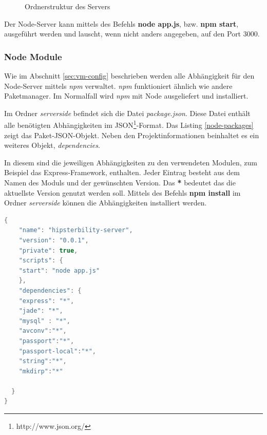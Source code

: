 \begin{figure}[h!]
	\centering
			\begin{minipage}[c]{\textwidth} %
			\end{minipage}
	\caption{Ordnerstruktur des Servers}
	\label{fig:server-tree}
\end{figure}

Der Node-Server kann mittels des Befehls \textbf{node app.js}, bzw. \textbf{npm start}, ausgeführt werden und lauscht, wenn nicht anders angegeben, auf den Port 3000. 

\subsubsection{Node Module \label{sec:node-mudules}}

Wie im Abschnitt \ref{sec:vm-config} beschrieben werden alle Abhängigkeit für den Node-Server mittels \emph{npm} verwaltet. 
\emph{npm} funktioniert ähnlich wie andere Paketmanager. 
Im Normalfall wird \emph{npm} mit Node ausgeliefert und installiert. 

Im Ordner \textit{serverside} befindet sich die Datei \emph{package.json}. Diese Datei enthält alle benötigten Abhängigkeiten im JSON\footnote{http://www.json.org/}-Format. Das Listing \ref{node-packages} zeigt das Paket-JSON-Objekt. 
Neben den Projektinformationen beinhaltet es ein weiteres Objekt, \emph{dependencies}. 

In diesem sind die jeweiligen Abhängigkeiten zu den verwendeten Modulen, zum Beispiel das Express-Framework, enthalten. Jeder Eintrag besteht aus dem Namen des Moduls und der gewünschten Version. Das \textbf{*} bedeutet das die aktuellste Version genutzt werden soll. Mittels des Befehls \textbf{npm install} im Ordner \textit{serverside} können die Abhängigkeiten installiert werden. 

\begin{lstlisting}[label=node-packages,language=Java, caption=Abhängigkeiten der Node-Anwendung]
{
    "name": "hipsterbility-server",
    "version": "0.0.1",
    "private": true,
    "scripts": {
    "start": "node app.js"
    },
    "dependencies": {
    "express": "*",
	"jade": "*",
	"mysql" : "*",
    "avconv":"*",
    "passport":"*",
    "passport-local":"*",
    "string":"*",
    "mkdirp":"*"

  }
}
\end{lstlisting}

